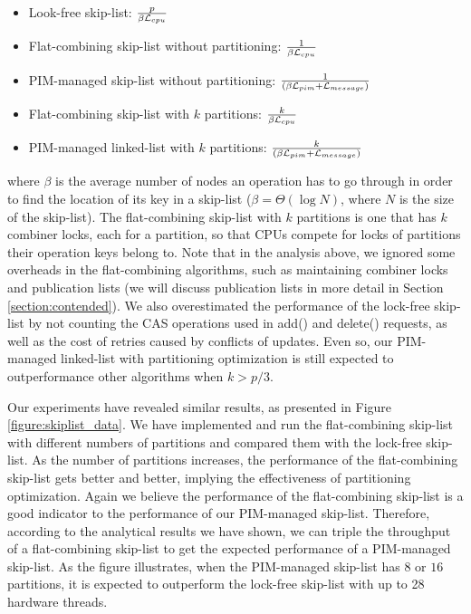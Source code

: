 \documentclass[11pt]{article}
\newcommand{\latpim} {\mathcal{L}_{pim}}
\newcommand{\latcpu} {\mathcal{L}_{cpu}}
\newcommand{\latmes} {\mathcal{L}_{message}}
\begin{document}
\begin{itemize}
\item Look-free skip-list:
	${p \over \beta\latcpu}$

\item Flat-combining skip-list without partitioning:
	${1 \over \beta\latcpu}$

\item PIM-managed skip-list without partitioning:
	${1 \over (\beta\latpim + \latmes)}$

\item Flat-combining skip-list with $k$ partitions:
    ${k \over \beta\latcpu}$

\item PIM-managed linked-list with $k$ partitions:
    ${k \over (\beta\latpim + \latmes)}$
\end{itemize}

where $\beta$ is the average number of nodes an operation has to go through
in order to find the location of its key in a skip-list
($\beta = \Theta(\log N)$, where $N$ is the size of the skip-list).
The flat-combining skip-list with $k$ partitions is one that has $k$ combiner locks,
each for a partition, so that CPUs compete for locks of partitions their operation
keys belong to.
Note that in the analysis above, we ignored some overheads in the flat-combining
algorithms, such as maintaining combiner locks and publication lists
(we will discuss publication lists in more detail in Section \ref{section:contended}).
We also overestimated the performance of the lock-free skip-list by not counting the
CAS operations used in add() and delete() requests, as well as the cost of retries
caused by conflicts of updates.
Even so, our PIM-managed linked-list with partitioning optimization is
still expected to outperformance other algorithms when $k > p/3$.

Our experiments have revealed similar results, 
as presented in Figure \ref{figure:skiplist_data}.
We have implemented and run the flat-combining skip-list with different numbers of
partitions and compared them with the lock-free skip-list.
As the number of partitions increases, the performance of the flat-combining skip-list
gets better and better, implying the effectiveness of partitioning optimization.
Again we believe the performance of the flat-combining skip-list is a good indicator
to the performance of our PIM-managed skip-list.
Therefore, according to the analytical results we have shown, we can triple the throughput
of a flat-combining skip-list to get the expected performance of a PIM-managed skip-list.
As the figure illustrates, when the PIM-managed skip-list has $8$ or $16$ partitions,
it is expected to outperform the lock-free skip-list with up to 28 hardware threads.
\end{document}
